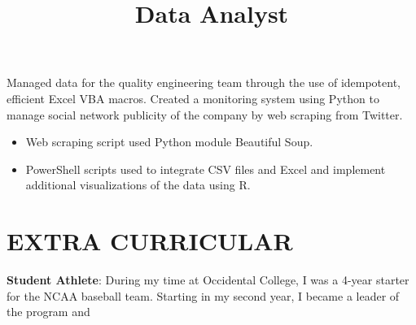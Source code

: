 \documentclass[margin]{res}
\begin{document}
\begin{resume}
\title{\textbf{Data Analyst}}
\begin{position}
	Managed data for the quality engineering team through the use of idempotent, efficient Excel VBA macros. Created a monitoring system using Python to manage social network publicity of the company by web scraping from Twitter.
	\begin{itemize}
		\item Web scraping script used Python module Beautiful Soup.
		\item PowerShell scripts used to integrate CSV files and Excel and implement additional visualizations of the data using R.
	\end{itemize}
\end{position}




\section{EXTRA CURRICULAR}
\par
\par
\textbf{Student Athlete}: During my time at Occidental College, I was a 4-year starter for the NCAA baseball team. Starting in my second year, I became a leader of the program and 
\par


\end{resume}
\end{document}
